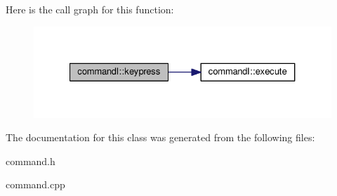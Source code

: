 Here is the call graph for this function\+:
\nopagebreak
\begin{figure}[H]
\begin{center}
\leavevmode
\includegraphics[width=327pt]{d9/d07/classcommandI_a552b20a9099915545e5c66f070a6e939_cgraph}
\end{center}
\end{figure}




The documentation for this class was generated from the following files\+:\begin{DoxyCompactItemize}
\item 
command.\+h\item 
command.\+cpp\end{DoxyCompactItemize}
